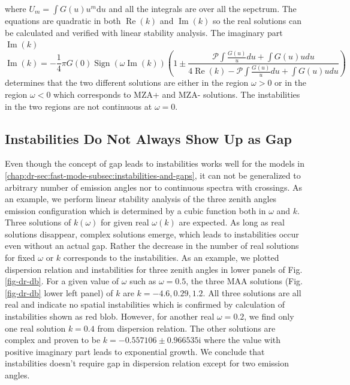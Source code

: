 where $U_m = \int G(u) u^m \mathrm du$ and all the integrals are over all the sepctrum. The equations are quadratic in both $\operatorname{Re}(k)$ and $\operatorname{Im}(k)$ so the real solutions can be calculated and verified with linear stability analysis. The imaginary part $\operatorname{Im}(k)$
\begin{equation}
   \operatorname{Im}(k) = - \frac{1}{4} \pi G(0) \operatorname{Sign}(\omega \operatorname{Im}(k) ) \left(  1 \pm \frac{ \mathscr P \int \frac{G(u)}{u} du + \int G(u) u du }{ 4 \operatorname{Re}(k) - \mathscr P \int \frac{G(u)}{u} du + \int G(u) u du }  \right)
\end{equation}
determines that the two different solutions are either in the region $\omega>0$ or in the region $\omega<0$ which corresponds to MZA+ and MZA- solutions. The instabilities in the two regions are not continuous at $\omega=0$.



\subsection{\label{chap:dr-sec:fast-mode-subsec:instability-to-gap}Instabilities Do Not Always Show Up as Gap}

Even though the concept of gap leads to instabilities works well for the models in \ref{chap:dr-sec:fast-mode-subsec:instabilities-and-gaps}, it can not be generalized to arbitrary number of emission angles nor to continuous spectra with crossings. As an example, we perform linear stability analysis of the three zenith angles emission configuration which is determined by a cubic function both in $\omega$ and $k$. Three solutions of $k(\omega)$ for given real $\omega(k)$  are expected. As long as real solutions disappear, complex solutions emerge, which leads to instabilities occur even without an actual gap. Rather the decrease in the number of real solutions for fixed $\omega$ or $k$ corresponds to the instabilities. As an example, we plotted dispersion relation and instabilities for three zenith angles in lower panels of Fig. \ref{fig-dr-db}. For a given value of $\omega$ such as $\omega= 0.5$, the three MAA solutions (Fig. \ref{fig-dr-db} lower left panel) of $k$ are $k=-4.6, 0.29, 1.2$. All three solutions are all real and indicate no spatial instabilities which is confirmed by calculation of instabilities shown as red blob. However, for another real $\omega = 0.2$, we find only one real solution $k=0.4$ from dispersion relation. The other solutions are complex and proven to be $k = -0.557106\pm 0.966535\mathrm i$ where the value with positive imaginary part leads to exponential growth. We conclude that instabilities doesn't require gap in dispersion relation except for two emission angles.


